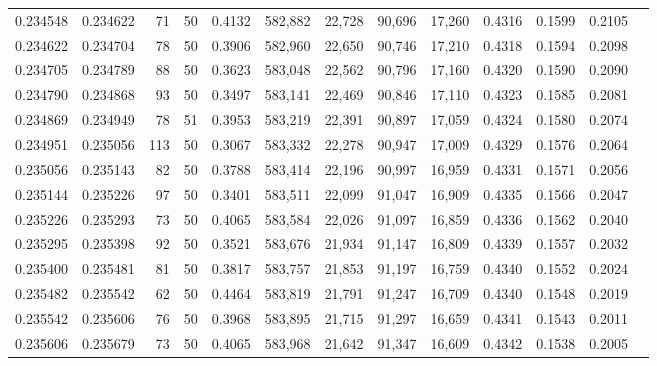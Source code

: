 \begin{tabular}{rrrrrrrrrrrrr}
0.234548 & 0.234622 &    71 &  50 &                                     0.4132 & 582,882 &  22,728 &  90,696 &  17,260 & 0.4316 & 0.1599 & 0.2105 \\
0.234622 & 0.234704 &    78 &  50 &                                     0.3906 & 582,960 &  22,650 &  90,746 &  17,210 & 0.4318 & 0.1594 & 0.2098 \\
0.234705 & 0.234789 &    88 &  50 &                                     0.3623 & 583,048 &  22,562 &  90,796 &  17,160 & 0.4320 & 0.1590 & 0.2090 \\
0.234790 & 0.234868 &    93 &  50 &                                     0.3497 & 583,141 &  22,469 &  90,846 &  17,110 & 0.4323 & 0.1585 & 0.2081 \\
0.234869 & 0.234949 &    78 &  51 &                                     0.3953 & 583,219 &  22,391 &  90,897 &  17,059 & 0.4324 & 0.1580 & 0.2074 \\
0.234951 & 0.235056 &   113 &  50 &                                     0.3067 & 583,332 &  22,278 &  90,947 &  17,009 & 0.4329 & 0.1576 & 0.2064 \\
0.235056 & 0.235143 &    82 &  50 &                                     0.3788 & 583,414 &  22,196 &  90,997 &  16,959 & 0.4331 & 0.1571 & 0.2056 \\
0.235144 & 0.235226 &    97 &  50 &                                     0.3401 & 583,511 &  22,099 &  91,047 &  16,909 & 0.4335 & 0.1566 & 0.2047 \\
0.235226 & 0.235293 &    73 &  50 &                                     0.4065 & 583,584 &  22,026 &  91,097 &  16,859 & 0.4336 & 0.1562 & 0.2040 \\
0.235295 & 0.235398 &    92 &  50 &                                     0.3521 & 583,676 &  21,934 &  91,147 &  16,809 & 0.4339 & 0.1557 & 0.2032 \\
0.235400 & 0.235481 &    81 &  50 &                                     0.3817 & 583,757 &  21,853 &  91,197 &  16,759 & 0.4340 & 0.1552 & 0.2024 \\
0.235482 & 0.235542 &    62 &  50 &                                     0.4464 & 583,819 &  21,791 &  91,247 &  16,709 & 0.4340 & 0.1548 & 0.2019 \\
0.235542 & 0.235606 &    76 &  50 &                                     0.3968 & 583,895 &  21,715 &  91,297 &  16,659 & 0.4341 & 0.1543 & 0.2011 \\
0.235606 & 0.235679 &    73 &  50 &                                     0.4065 & 583,968 &  21,642 &  91,347 &  16,609 & 0.4342 & 0.1538 & 0.2005 \\

\end{tabular}
